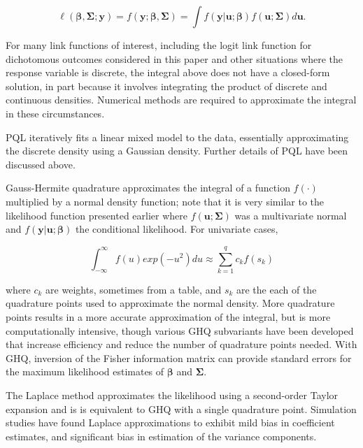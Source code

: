 \documentclass{article}
\begin{document}
\begin{flushleft}
\begin{equation}
 \ell(\boldsymbol{\beta}, \mathbf{\Sigma} ; \mathbf{y})=f(\mathbf{y};\boldsymbol{\beta}, \mathbf{\Sigma})=\int f(\mathbf{y}|\mathbf{u};\boldsymbol{\beta})f(\mathbf{u}; \mathbf{\Sigma})d\mathbf{u}.   
\end{equation}

For many link functions of interest, including the logit link function for dichotomous outcomes considered in this paper and other situations where the response variable is discrete, the integral above does not have a closed-form solution, in part because it involves integrating the product of discrete and continuous densities\cite{ng_estimation_2006}. Numerical methods are required to approximate the integral in these circumstances.

PQL iteratively fits a linear mixed model\cite{lin_bias_1996} to the data, essentially approximating the discrete density using a Gaussian density\cite{ng_estimation_2006}. Further details of PQL have been discussed above.

Gauss-Hermite quadrature approximates the integral of a function $f(\cdot)$ multiplied by a normal density function; note that it is very similar to the likelihood function presented earlier where $f(\mathbf{u}; \mathbf{\Sigma})$ was a multivariate normal and $f(\mathbf{y}|\mathbf{u};\boldsymbol{\beta})$ the conditional likelihood. For univariate cases,

\begin{equation}
    \int_{-\infty}^{\infty}f(u)exp(-u^2)du \approx \sum_{k=1}^q c_kf(s_k)
\end{equation}

where $c_k$ are weights, sometimes from a table, and $s_k$ are the each of the quadrature points used to approximate the normal density. More quadrature points results in a more accurate approximation of the integral, but is more computationally intensive, though various GHQ subvariants have been developed that increase efficiency and reduce the number of quadrature points needed\cite{pinheiro_efficient_2006}. With GHQ, inversion of the Fisher information matrix can provide standard errors for the maximum likelihood estimates of $\boldsymbol{\beta}$ and $\mathbf{\Sigma}$. 


The Laplace method approximates the likelihood using a second-order Taylor expansion \cite{pinheiro_approximations_1995} and is is equivalent to GHQ with a single quadrature point\cite{liu_note_1994}. Simulation studies have found Laplace approximations to exhibit mild bias in coefficient estimates, and significant bias in estimation of the variance components\cite{pinheiro_efficient_2006}.

\end{flushleft}

\clearpage
\printbibliography
\end{document}
